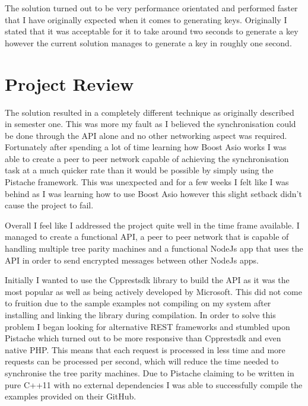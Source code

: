 The solution turned out to be very performance orientated and performed faster that I have originally expected when it comes to generating keys. Originally I stated that it was acceptable for it to take around two seconds to generate a key however the current solution manages to generate a key in roughly one second.


\section{Project Review}
The solution resulted in a completely different technique as originally described in semester one. This was more my fault as I believed the synchronisation could be done through the API alone and no other networking aspect was required. Fortunately after spending a lot of time learning how Boost Asio works I was able to create a peer to peer network capable of achieving the synchronisation task at a much quicker rate than it would be possible by simply using the Pistache framework. This was unexpected and for a few weeks I felt like I was behind as I was learning how to use Boost Asio however this slight setback didn't cause the project to fail. 

Overall I feel like I addressed the project quite well in the time frame available. I managed to create a functional API, a peer to peer network that is capable of handling multiple tree parity machines and a functional NodeJs app that uses the API in order to send encrypted messages between other NodeJs apps.

Initially I wanted to use the Cpprestsdk library to build the API as it was the most popular as well as being actively developed by Microsoft. This did not come to fruition due to the sample examples not compiling on my system after installing and linking the library during compilation. In order to solve this problem I began looking for alternative REST frameworks and stumbled upon Pistache which turned out to be more responsive than Cpprestsdk and even native PHP. This means that each request is processed in less time and more requests can be processed per second, which will reduce the time needed to synchronise the tree parity machines. Due to Pistache claiming to be written in pure C++11 with no external dependencies I was able to successfully compile the examples provided on their GitHub. 

